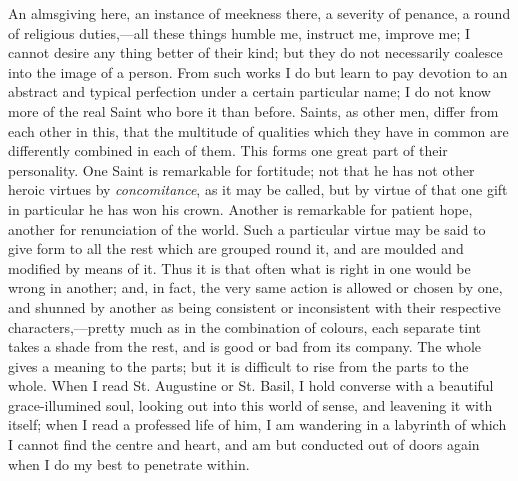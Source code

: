 An almsgiving here, an instance of meekness there, a severity of
penance, a round of religious duties,—all these things humble me,
instruct me, improve me; I cannot desire any thing better of their
kind; but they do not necessarily coalesce into the image of a person.
From such works I do but learn to pay devotion to an abstract and
typical perfection under a certain particular name; I do not know more
of the real Saint who bore it than before. Saints, as other men,
differ from each other in this, that the multitude of qualities which
they have in common are differently combined in each of them. This
forms one great part of their personality. One Saint is remarkable for
fortitude; not that he has not other heroic virtues by \emph{concomitance},
as it may be called, but by virtue of that one gift in particular he
has won his crown. Another is remarkable for patient hope, another for
renunciation of the world. Such a particular virtue may be said to
give form to all the rest which are grouped round it, and are moulded
and modified by means of it. Thus it is that often what is right in one would be wrong in another; and, in fact, the very same action
is allowed or chosen by one, and shunned by another as being
consistent or inconsistent with their respective characters,—pretty
much as in the combination of colours, each separate tint takes a
shade from the rest, and is good or bad from its company. The whole
gives a meaning to the parts; but it is difficult to rise from the
parts to the whole. When I read St. Augustine or St. Basil, I hold
converse with a beautiful grace-illumined soul, looking out into this
world of sense, and leavening it with itself; when I read a professed
life of him, I am wandering in a labyrinth of which I cannot find the
centre and heart, and am but conducted out of doors again when I do my
best to penetrate within.

